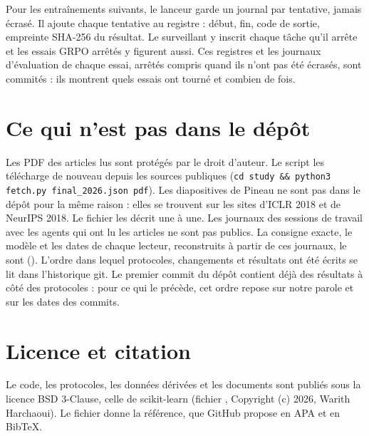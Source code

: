 Pour les entraînements suivants, le lanceur  garde un journal par tentative, jamais
écrasé. Il ajoute chaque tentative au registre  : début, fin, code de
sortie, empreinte SHA-256 du résultat. Le surveillant y inscrit chaque tâche qu'il arrête et les
essais GRPO arrêtés y figurent aussi. Ces registres et les journaux d'évaluation de chaque essai,
arrêtés compris quand ils n'ont pas été écrasés, sont commités : ils montrent quels essais ont
tourné et combien de fois.

\section{Ce qui n'est pas dans le dépôt}
\label{sec:absent}

Les PDF des articles lus sont protégés par le droit d'auteur. Le script  les
télécharge de nouveau depuis les sources publiques (\texttt{cd study \&\& python3 fetch.py
final\_2026.json pdf}). Les diapositives de Pineau ne sont pas dans le dépôt pour la même raison :
elles se trouvent sur les sites d'ICLR 2018 et de NeurIPS 2018. Le fichier
 les décrit une à une. Les journaux des sessions de travail avec les agents qui
ont lu les articles ne sont pas publics. La consigne exacte, le modèle et les dates de chaque
lecteur, reconstruits à partir de ces journaux, le sont (). L'ordre dans lequel
protocoles, changements et résultats ont été écrits se lit dans l'historique git. Le premier commit
du dépôt contient déjà des résultats à côté des protocoles : pour ce qui le précède, cet ordre repose
sur notre parole et sur les dates des commits.

\section{Licence et citation}
\label{sec:licence}

Le code, les protocoles, les données dérivées et les documents sont publiés sous la licence
BSD 3-Clause, celle de scikit-learn (fichier , Copyright (c) 2026, Warith Harchaoui).
Le fichier  donne la référence, que GitHub propose en APA et en BibTeX.
